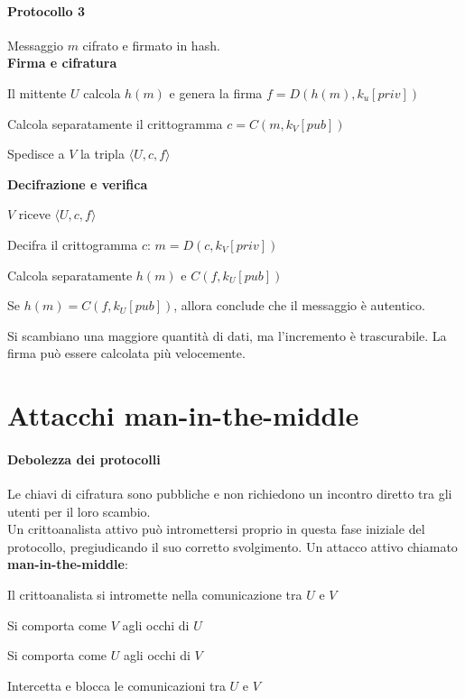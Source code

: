 \documentclass[10pt]{book}
\begin{document}
\paragraph{Protocollo 3} Messaggio $m$ cifrato e firmato in hash.\\
\textbf{Firma e cifratura}\begin{list}{}{}
	\item Il mittente $U$ calcola $h(m)$ e genera la firma $f = D(h(m), k_u[priv])$
	\item Calcola separatamente il crittogramma $c = C(m, k_V[pub])$
	\item Spedisce a $V$ la tripla $\langle U,c,f\rangle$
\end{list}
\textbf{Decifrazione e verifica}\begin{list}{}{}
	\item $V$ riceve $\langle U,c,f\rangle$
	\item Decifra il crittogramma $c$: $m = D(c, k_V[priv])$
	\item Calcola separatamente $h(m)$ e $C(f,k_U[pub])$
	\item Se $h(m) = C(f, k_U[pub])$, allora conclude che il messaggio è autentico.
\end{list}
Si scambiano una maggiore quantità di dati, ma l'incremento è trascurabile. La firma può essere calcolata più velocemente.
\pagebreak
\section{Attacchi man-in-the-middle}
\paragraph{Debolezza dei protocolli} Le chiavi di cifratura sono pubbliche e non richiedono un incontro diretto tra gli utenti per il loro scambio.\\
Un crittoanalista attivo può intromettersi proprio in questa fase iniziale del protocollo, pregiudicando il suo corretto svolgimento. Un attacco attivo chiamato \textbf{man-in-the-middle}:
\begin{list}{}{}
	\item Il crittoanalista si intromette nella comunicazione tra $U$ e $V$
	\item Si comporta come $V$ agli occhi di $U$
	\item Si comporta come $U$ agli occhi di $V$
	\item Intercetta e blocca le comunicazioni tra $U$ e $V$
\end{list}
\end{document}
